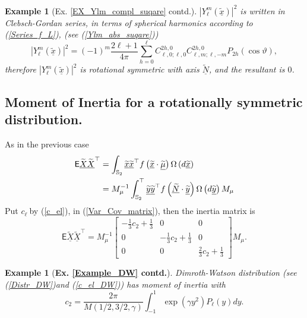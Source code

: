 \documentclass[preprint,11pt,a4paper]{elsarticle}
\newtheorem{example}[theorem]{Example}
\begin{document}
\begin{example}[Ex. \protect\ref{EX_Ylm_compl_suqare} contd.]
$\left\vert Y_{\ell }^{m}\left( \underline{\widetilde{x}}\right) \right\vert
^{2}$ is written in Clebsch-Gordan series, in terms of spherical harmonics
according to (\ref{Series_f_L}), (see (\ref{Ylm_abs_suqare})) 
\begin{equation}
\left\vert Y_{\ell }^{m}\left( \underline{\widetilde{x}}\right) \right\vert
^{2}=\left( -1\right) ^{m}\frac{2\ell +1}{4\pi }\sum_{h=0}^{\ell }C_{\ell
,0;\ell ,0}^{2h,0}C_{\ell ,m;\ell ,-m}^{2h,0}P_{2h}\left( \cos \vartheta
\right) ,  \label{Density_SphH}
\end{equation}%
therefore $\left\vert Y_{\ell }^{m}\left( \underline{\widetilde{x}}\right)
\right\vert ^{2}$ is rotational symmetric with axis $\underline{\widetilde{N}%
}$, and the resultant is $0$.
\end{example}

\subsection{Moment of Inertia for a rotationally symmetric distribution.}

As in the previous case \textbf{\ }%
\begin{align*}
\mathsf{E}\widetilde{\underline{X}}\widetilde{\underline{X}}^{\top} & =\int_{%
\mathbb{S}_{2}}\underline{\widetilde{x}}\underline{\widetilde{x}}%
^{\top}f\left( \underline{\widetilde{x}}\cdot\underline{\widetilde{\mu}}%
\right) \Omega\left( d\underline{\widetilde{x}}\right) \\
& =M_{\mu}^{-1}\int_{\mathbb{S}_{2}}^{\top}\underline{\widetilde{y}}%
\underline{\widetilde{y}}^{\top}f\left( \underline{\widetilde{N}}\cdot%
\underline{\widetilde{y}}\right) \Omega\left( d\underline{\widetilde{y}}%
\right) M_{\mu}
\end{align*}
Put $c_{\ell}\ $by (\ref{c_el}), in (\ref{Var_Cov_matrix}), then the inertia
matrix is 
\begin{equation*}
\mathsf{E}\widetilde{\underline{X}}\widetilde{\underline{X}}^{\top}=M_{\mu
}^{-1}%
\begin{bmatrix}
-\frac{1}{3}c_{2}+\frac{1}{3} & 0 & 0 \\ 
0 & -\frac{1}{3}c_{2}+\frac{1}{3} & 0 \\ 
0 & 0 & \frac{2}{3}c_{2}+\frac{1}{3}%
\end{bmatrix}
M_{\mu}.
\end{equation*}

\begin{example}[\textbf{Ex. \protect\ref{Example_DW} contd.}]
Dimroth-Watson distribution (see (\ref{Distr_DW})and (\ref{c_el_DW})) has
moment of inertia with 
\begin{equation*}
c_{2}=\frac{2\pi}{M\left( 1/2,3/2,\gamma\right) }\int_{-1}^{1}\exp\left(
\gamma y^{2}\right) P_{\ell}\left( y\right) dy. 
\end{equation*}
\end{example}
\end{document}
